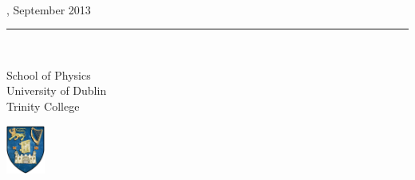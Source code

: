 \documentclass[a4paper, twoside, 12pt]{Latex/Classes/PhDthesisPSnPDF}
\begin{document}
\vspace*{\fill}
\begin{flushright}
	{ \\[1mm]
	{, September 2013}\\[.5mm]
	\rule{0.9\textwidth}{0.5mm}\\[4mm]

		\begin{minipage}[b][15mm][t]{12.5cm}
			\raggedleft \sc
			School of Physics\\
			University of Dublin\\
			Trinity College\\
		\end{minipage}
		
	\hspace*{1mm}

		\begin{minipage}[b][15mm][t]{1.15cm}
			\includegraphics[height=16mm]{tcd_crest.jpg}
		\end{minipage}}

 \end{flushright}
\newpage
\thispagestyle{empty}
\mbox{}



\frontmatter




\newpage
\thispagestyle{empty}
\mbox{}

\newpage
\thispagestyle{empty}
\mbox{}





\setcounter{secnumdepth}{3} %
\setcounter{tocdepth}{3}    %
\tableofcontents            %



\listoffigures	%
\end{document}
